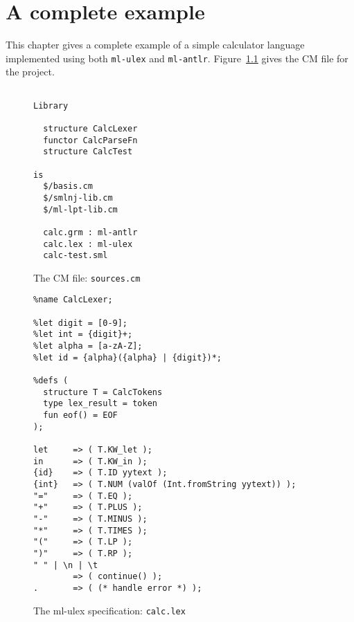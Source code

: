 %
\chapter{A complete example}
\label{ch:example}

This chapter gives a complete example of a simple calculator
language implemented using both \texttt{ml-ulex} and \texttt{ml-antlr}.
Figure~\ref{fig:calc-sources} gives the CM file for the project.
\begin{figure}[h]
\begin{verbatim}

Library

  structure CalcLexer
  functor CalcParseFn
  structure CalcTest

is
  $/basis.cm
  $/smlnj-lib.cm
  $/ml-lpt-lib.cm

  calc.grm : ml-antlr
  calc.lex : ml-ulex
  calc-test.sml

\end{verbatim}
\caption{The CM file: {\tt sources.cm}}
\label{fig:calc-sources}
\end{figure}

\begin{figure}

\begin{verbatim}
%name CalcLexer;

%let digit = [0-9];
%let int = {digit}+;
%let alpha = [a-zA-Z];
%let id = {alpha}({alpha} | {digit})*;

%defs (
  structure T = CalcTokens
  type lex_result = token
  fun eof() = EOF
);

let     => ( T.KW_let );
in      => ( T.KW_in );
{id}    => ( T.ID yytext );
{int}   => ( T.NUM (valOf (Int.fromString yytext)) );
"="     => ( T.EQ );
"+"     => ( T.PLUS );
"-"     => ( T.MINUS );
"*"     => ( T.TIMES );
"("     => ( T.LP );
")"     => ( T.RP );
" " | \n | \t
        => ( continue() );
.       => ( (* handle error *) );
\end{verbatim}
\caption{The ml-ulex specification: {\tt calc.lex}}
\label{fig:calc-lex}
\end{figure}

